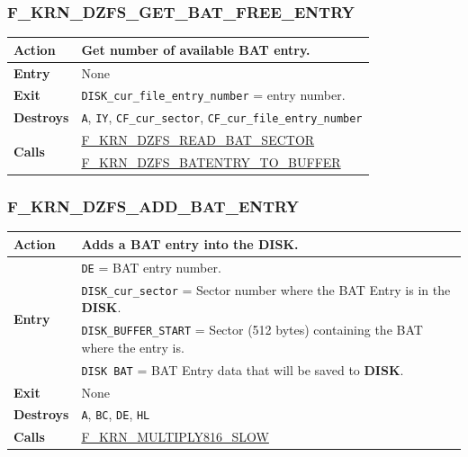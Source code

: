 \documentclass[a4paper,11pt]{article}
\begin{document}
        \subsubsection{F\_KRN\_DZFS\_GET\_BAT\_FREE\_ENTRY}
        \label{func:fkrndzfsgetbatfreeentry}
        \begin{tabular}{l p{9cm}}
            \hline\textbf{Action}
            & Get number of available BAT entry.\\
            \hline\textbf{Entry} & None\\
            \hline\textbf{Exit} & \texttt{DISK\_cur\_file\_entry\_number} =
            entry number.\\
            \hline\textbf{Destroys} & \texttt{A}, \texttt{IY},
            \texttt{CF\_cur\_sector}, \texttt{CF\_cur\_file\_entry\_number}\\
            \hline\multirow[t]{2}{4em}{\textbf{Calls}}
            & \hyperref[func:fkrndzfsreadbatsector]{F\_KRN\_DZFS\_READ\_BAT\_SECTOR}\\
            & \hyperref[func:fkrndzfsbatentrytobuffer]{F\_KRN\_DZFS\_BATENTRY\_TO\_BUFFER}\\
            \hline
        \end{tabular}

        \subsubsection{F\_KRN\_DZFS\_ADD\_BAT\_ENTRY}
        \label{func:fkrndzfsaddbatentry}
        \begin{tabular}{l p{9cm}}
            \hline\textbf{Action}
            & Adds a BAT entry into the \textbf{DISK}.\\
            \hline\multirow[t]{4}{4em}{\textbf{Entry}}
            & \texttt{DE} = BAT entry number.\\
            & \texttt{DISK\_cur\_sector} = Sector number where the BAT Entry is
            in the \textbf{DISK}.\\
            & \texttt{DISK\_BUFFER\_START} = Sector (512 bytes) containing the
            BAT where the entry is.\\
            & \texttt{DISK BAT} = BAT Entry data that will be saved to 
            \textbf{DISK}.\\
            \hline\textbf{Exit} & None\\
            \hline\textbf{Destroys} & \texttt{A}, \texttt{BC}, \texttt{DE}, 
            \texttt{HL}\\
            \hline\textbf{Calls}
            & \hyperref[func:fkrnmultiply816slow]{F\_KRN\_MULTIPLY816\_SLOW}\\
            \hline
        \end{tabular}
\end{document}
